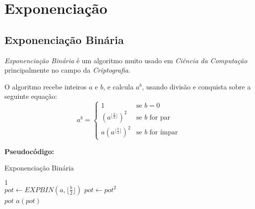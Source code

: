 







\section{Exponenciação}

\subsection{Exponenciação Binária}

\textit{Exponenciação Binária} é um algoritmo muito usado em \textit{Ciência da Computação} principalmente no campo da \textit{Criptografia}.

O algoritmo recebe inteiros $a$ e $b$, e calcula $a^b$, usando divisão e conquista sobre a seguinte equação:
\[
 a^b = 
  \begin{cases} 
   1& \text{se } b = 0 \\
   (a^{\lfloor \frac{b}{2} \rfloor})^2& \text{se } b \text{ for par} \\
   a(a^{\lfloor \frac{b}{2} \rfloor})^2& \text{se } b \text{ for ímpar} 
  \end{cases}
\]

\textbf{Pseudocódigo:}
\begin{algorithm}
\caption{Exponenciação Binária}
\begin{algorithmic}[1]
\State \Return $1$
\EndIf 
\\
\State $pot \gets EXPBIN(a, \lfloor \frac{b}{2} \rfloor)$
\State $pot \gets pot^2$
\\
\State \Return $pot$
\Else
\State \Return $a(pot)$
\EndIf

\EndProcedure
\end{algorithmic}
\end{algorithm}


